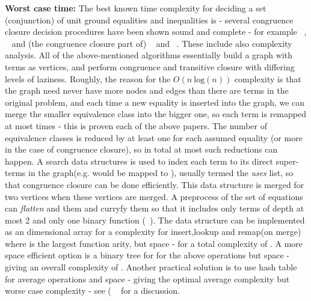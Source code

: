 \textbf{Worst case time:} The best known time complexity for deciding a set (conjunction) of unit ground equalities and inequalities is  - several congruence closure decision procedures have been shown sound and complete - for example ~\cite{DowneySethiTarjan}, ~\cite{NieuwenhuisOliveras03} and (the congruence closure part of) ~\cite{Shostak84} and ~\cite{NelsonOppen80}. These include also complexity analysis.
All of the above-mentioned algorithms essentially build a graph with terms as vertices, and perform congruence and transitive closure with differing levels of laziness.
Roughly, the reason for the $O(n\ \mathrm{log}(n))$ complexity is that the graph need never have more nodes and edges than there are terms in the original problem, and each time a new equality is inserted into the graph, we can merge the smaller equivalence class into the bigger one, so each term is remapped at most  times - this is proven each of the above papers. 
The number of equivalence classes is reduced by at least one for each assumed equality (or more in the case of congruence closure), so in total at most  such reductions can happen. A search data structures is used to index each term to its direct super-terms in the graph(e.g.  would be mapped to ), usually termed the \emph{uses} list, so that congruence closure can be done efficiently. This data structure is merged for two vertices when these vertices are merged.
A preprocess of the set of equations can \emph{flatten} and them and curryfy them so that it includes only terms of depth at most 2 and only one binary function (~\cite{NieuwenhuisOliveras03}).
The  data structure can be implemented as an  dimensional array for a complexity  for insert,lookup and remap(on merge) where  is the largest function arity, but space  - for a total complexity of .
A more space efficient option is a binary tree for  for the above operations but space  - giving an overall complexity of . 
Another practical solution is to use hash table for average  operations and  space - giving the optimal average complexity but worse case  complexity - see ( ~\cite{DowneySethiTarjan} for a discussion.

